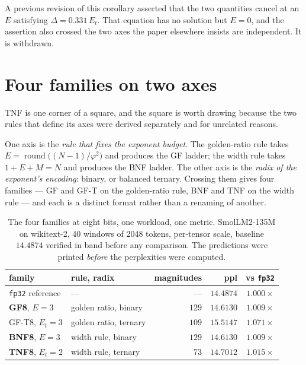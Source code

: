 A previous revision of this corollary asserted that the two quantities cancel at
an $E$ satisfying $\Delta = 0.331\,E_t$. That equation has no solution but
$E = 0$, and the assertion also crossed the two axes the paper elsewhere insists
are independent. It is withdrawn.


\section{Four families on two axes}\label{sec:fourfamilies}

TNF is one corner of a square, and the square is worth drawing because the two
rules that define its axes were derived separately and for unrelated reasons.

One axis is the \emph{rule that fixes the exponent budget}. The golden-ratio
rule takes $E=\operatorname{round}\!\bigl((N-1)/\varphi^{2}\bigr)$ and produces
the GF ladder; the width rule takes $1+E+M=N$ and produces the BNF ladder. The
other axis is the \emph{radix of the exponent's encoding}: binary, or balanced
ternary. Crossing them gives four families --- GF and GF-T on the golden-ratio
rule, BNF and TNF on the width rule --- and each is a distinct format rather
than a renaming of another.

\begin{table}[t]\centering
\caption{The four families at eight bits, one workload, one metric.
SmolLM2-135M on wikitext-2, 40 windows of 2048 tokens, per-tensor scale,
baseline $14.4874$ verified in band before any comparison. The predictions were
printed \emph{before} the perplexities were computed.}
\label{tab:fourfam}
\begin{tabular}{llrrr}
\toprule
family & rule, radix & magnitudes & ppl & vs \texttt{fp32} \\
\midrule
\texttt{fp32} reference & --- & --- & $14.4874$ & $1.000\times$ \\
\midrule
\textbf{GF8}, $E{=}3$   & golden ratio, binary  & $129$ & $\mathbf{14.6130}$ & $1.009\times$ \\
GF-T8, $E_t{=}3$        & golden ratio, ternary & $109$ & $15.5147$ & $1.071\times$ \\
\textbf{BNF8}, $E{=}3$  & width rule, binary    & $129$ & $\mathbf{14.6130}$ & $1.009\times$ \\
\textbf{TNF8}, $E_t{=}2$& width rule, ternary   & $73$  & $\mathbf{14.7012}$ & $1.015\times$ \\
\bottomrule
\end{tabular}
\end{table}

